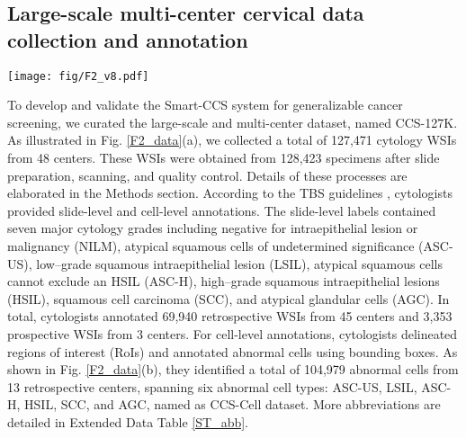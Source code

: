 \subsection*{Large-scale multi-center cervical data collection and annotation}\label{subsec2-1}

\begin{figure*}[htbp]
    \centering
    \texttt{[image: fig/F2\_v8.pdf]}%
    \caption{\textbf{Overview of CCS-127K data and annotations in this study.} \textbf{a}. Class-wise distribution of 127,471 WSIs collected from 48 medical centers, including 124118 samples from 45 retrospective centers and 3,353 samples from 3 prospective centers. Note: RCM represents the centers merged due to limited sample size for each center. \textbf{b}. Abnormal cell annotation statistics: 104,979 abnormal lesion cells were annotated into 6 categories, ASC-US, LSIL, ASC-H, HSIL, SCC, and AGC, termed as CCS-Cell dataset. \textbf{c}. Designed flowchart of the study for the development and validation of the proposed Smart-CCS system. The orange flow represents retrospective studies, while the blue flow represents prospective studies.}
    \label{F2_data}
\end{figure*}
To develop and validate the Smart-CCS system for generalizable cancer screening, we curated the large-scale and multi-center dataset, named CCS-127K. As illustrated in Fig. \ref{F2_data}(a), we collected a total of 127,471 cytology WSIs from 48 centers. These WSIs were obtained from 128,423 specimens after slide preparation, scanning, and quality control. Details of these processes are elaborated in the Methods section. According to the TBS guidelines \cite{nayar2015bethesda}, cytologists provided slide-level and cell-level annotations. The slide-level labels contained seven major cytology grades including negative for intraepithelial lesion or malignancy (NILM), atypical squamous cells of undetermined significance (ASC-US), low–grade squamous intraepithelial lesion (LSIL), atypical squamous cells cannot exclude an HSIL (ASC-H), high–grade squamous intraepithelial lesions (HSIL), squamous cell carcinoma (SCC), and atypical glandular cells (AGC). In total, cytologists annotated 69,940 retrospective WSIs from 45 centers and 3,353 prospective WSIs from 3 centers.
For cell-level annotations, cytologists delineated regions of interest (RoIs) and annotated abnormal cells using bounding boxes. As shown in Fig. \ref{F2_data}(b), they identified a total of 104,979 abnormal cells from 13 retrospective centers, spanning six abnormal cell types: ASC-US, LSIL, ASC-H, HSIL, SCC, and AGC, named as CCS-Cell dataset. More abbreviations are detailed in Extended Data Table \ref{ST_abb}.

